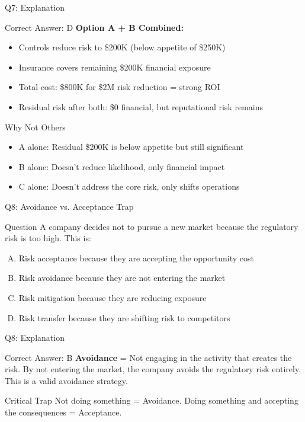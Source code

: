 \documentclass{beamer}
\begin{document}
	\begin{frame}{Q7: Explanation}
		\begin{block}{Correct Answer: D}
			\textbf{Option A + B Combined:}
			\begin{itemize}
				\item Controls reduce risk to \$200K (below appetite of \$250K)
				\item Insurance covers remaining \$200K financial exposure
				\item Total cost: \$800K for \$2M risk reduction = strong ROI
				\item Residual risk after both: \$0 financial, but reputational risk remains
			\end{itemize}
		\end{block}
		\begin{block}{Why Not Others}
			\begin{itemize}
				\item A alone: Residual \$200K is below appetite but still significant
				\item B alone: Doesn't reduce likelihood, only financial impact
				\item C alone: Doesn't address the core risk, only shifts operations
			\end{itemize}
		\end{block}
	\end{frame}
	
	\begin{frame}{Q8: Avoidance vs. Acceptance Trap}
		\begin{block}{Question}
			A company decides not to pursue a new market because the regulatory risk is too high. This is:
		\end{block}
		\begin{enumerate}[(A)]
			\item Risk acceptance because they are accepting the opportunity cost
			\item Risk avoidance because they are not entering the market
			\item Risk mitigation because they are reducing exposure
			\item Risk transfer because they are shifting risk to competitors
		\end{enumerate}
	\end{frame}
	
	\begin{frame}{Q8: Explanation}
		\begin{block}{Correct Answer: B}
			\textbf{Avoidance} = Not engaging in the activity that creates the risk. By not entering the market, the company avoids the regulatory risk entirely. This is a valid avoidance strategy.
		\end{block}
		\begin{alertblock}{Critical Trap}
			Not doing something = Avoidance.
			Doing something and accepting the consequences = Acceptance.
		\end{alertblock}
	\end{frame}
	
\end{document}
